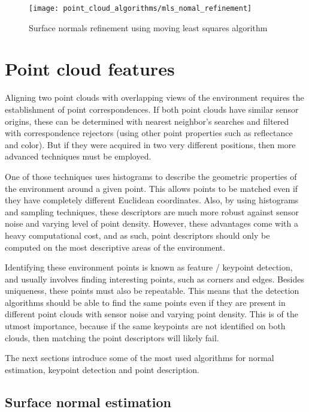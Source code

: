 \begin{figure}[H]
	\centering
	\texttt{[image: point\_cloud\_algorithms/mls\_nomal\_refinement]}
	\caption{Surface normals refinement using moving least squares algorithm \cite{Rusu2010a}}
	\label{fig:point-cloud-algorithms_mls-nomal-refinement}
\end{figure}



\section{Point cloud features}

Aligning two point clouds with overlapping views of the environment requires the establishment of point correspondences. If both point clouds have similar sensor origins, these can be determined with nearest neighbor's searches and filtered with correspondence rejectors (using other point properties such as reflectance and color). But if they were acquired in two very different positions, then more advanced techniques must be employed.

One of those techniques uses histograms to describe the geometric properties of the environment around a given point. This allows points to be matched even if they have completely different Euclidean coordinates. Also, by using histograms and sampling techniques, these descriptors are much more robust against sensor noise and varying level of point density. However, these advantages come with a heavy computational cost, and as such, point descriptors should only be computed on the most descriptive areas of the environment.

Identifying these environment points is known as feature / keypoint detection, and usually involves finding interesting points, such as corners and edges. Besides uniqueness, these points must also be repeatable. This means that the detection algorithms should be able to find the same points even if they are present in different point clouds with sensor noise and varying point density. This is of the utmost importance, because if the same keypoints are not identified on both clouds, then matching the point descriptors will likely fail.

The next sections introduce some of the most used algorithms for normal estimation, keypoint detection and point description.


\subsection{Surface normal estimation}

